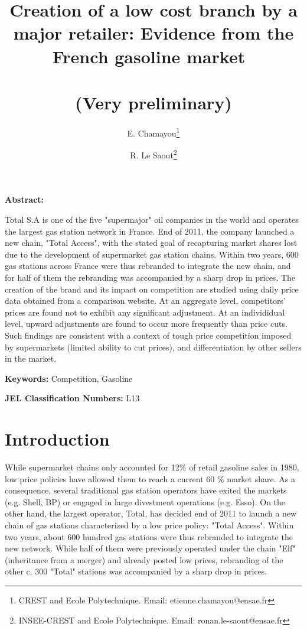 \documentclass[11pt]{article}
\begin{document}
\title{Creation of a low cost branch by a major retailer: Evidence from the French gasoline market\ \\ \ \\(Very preliminary)}
\author{
  E. Chamayou\thanks{CREST and Ecole Polytechnique. Email: etienne.chamayou@ensae.fr}
  \and
  R. Le Saout\thanks{INSEE-CREST and Ecole Polytechnique. Email: ronan.le-saout@ensae.fr}
}
\maketitle

\sloppy%

\onehalfspacing

\textbf{Abstract:}

Total S.A is one of the five "supermajor" oil companies in the world and operates the largest gas station network in France. End of 2011, the company launched a new chain, "Total Access", with the stated goal of recapturing market shares lost due to the development of supermarket gas station chains. Within two years, 600 gas stations across France were thus rebranded to integrate the new chain, and for half of them the rebranding was accompanied by a sharp drop in prices. The creation of the brand and its impact on competition are studied using daily price data obtained from a comparison website. At an aggregate level, competitors' prices are found not to exhibit any significant adjustment. At an individidual level, upward adjustments are found to occur more frequently than price cuts. Such findings are consistent with a context of tough price competition imposed by supermarkets (limited ability to cut prices), and differentiation by other sellers in the market.

\strut

\textbf{Keywords:} Competition, Gasoline

\strut

\textbf{JEL Classification Numbers:} L13

\pagebreak%

\section{Introduction}

While supermarket chains only accounted for 12\% of retail gasoline sales in 1980, low price policies have allowed them to reach a current 60 \% market share. As a consequence, several traditional gas station operators have exited the markets (e.g. Shell, BP) or engaged in large divestment operations (e.g. Esso). On the other hand, the largest operator, Total, has decided end of 2011 to launch a new chain of gas stations characterized by a low price policy: "Total Access". Within two years, about 600 hundred gas stations were thus rebranded to integrate the new network. While half of them were previously operated under the chain "Elf" (inheritance from a merger) and already posted low prices, rebranding of the other c. 300 "Total" stations was accompanied by a sharp drop in prices.
\end{document}
